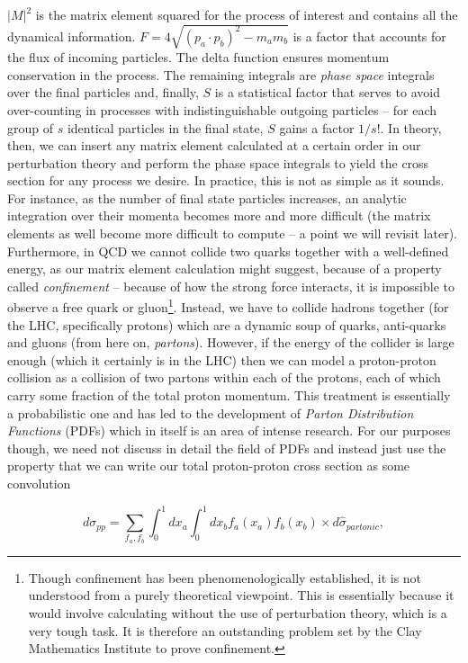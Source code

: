 $|M|^2$ is the matrix element squared for the process of interest and contains all the dynamical information. $F = 4 \sqrt{(p_a \cdot p_b)^2 - m_a m_b}$  is a factor that accounts for the flux of incoming particles. The delta function ensures momentum conservation in the process. The remaining integrals are \emph{phase space} integrals over the final particles and, finally, $S$ is a statistical factor that serves to avoid over-counting in processes with indistinguishable outgoing particles -- for each group of $s$ identical particles in the final state, $S$ gains a factor $1/s!$. In theory, then, we can insert any matrix element calculated at a certain order in our perturbation theory and perform the phase space integrals to yield the cross section for any process we desire. In practice, this is not as simple as it sounds. For instance, as the number of final state particles increases, an analytic integration over their momenta becomes more and more difficult (the matrix elements as well become more difficult to compute -- a point we will revisit later). Furthermore, in QCD we cannot collide two quarks together with a well-defined energy, as our matrix element calculation might suggest, because of a property called \emph{confinement} -- because of how the strong force interacts, it is impossible to observe a free quark or gluon\footnote{Though confinement has been phenomenologically established, it is not understood from a purely theoretical viewpoint. This is essentially because it would involve calculating without the use of perturbation theory, which is a very tough task. It is therefore an outstanding problem set by the Clay Mathematics Institute to prove confinement.}. Instead, we have to collide hadrons together (for the LHC, specifically protons) which are a dynamic soup of quarks, anti-quarks and gluons (from here on, \emph{partons}). However, if the energy of the collider is large enough (which it certainly is in the LHC) then we can model a proton-proton collision as a collision of two partons within each of the protons, each of which carry some fraction of the total proton momentum. This treatment is essentially a probabilistic one and has led to the development of \emph{Parton Distribution Functions} (PDFs) \cite{Soper1997} which in itself is an area of intense research. For our purposes though, we need not discuss in detail the field of PDFs and instead just use the property that we can write our total proton-proton cross section as some convolution

\begin{equation}
d \sigma_{pp} = \sum_{f_a, f_b} \int_0^1 dx_a \int_0^1 dx_b f_a(x_a) f_b(x_b) \times d\hat{\sigma}_{partonic},
\end{equation}

